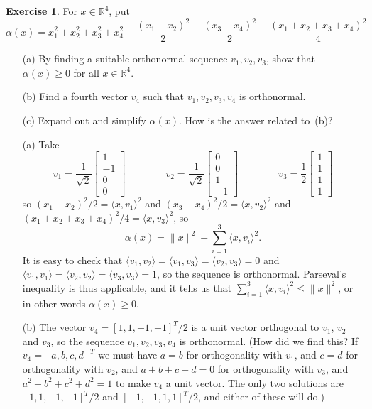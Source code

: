 \documentclass{amsart}
\newcommand{\R}         {{\mathbb{R}}}
\newcommand{\bsm}       {\left[\begin{smallmatrix}}
\newcommand{\esm}       {\end{smallmatrix}\right]}
\newcommand{\al}        {\alpha}
\newcommand{\ip}[1]     {\langle #1\rangle}
\renewcommand{\:}       {\colon}
\theoremstyle{definition}
\newtheorem{exercise}{Exercise}[section]
\renewenvironment{solution}{\SolutionAtEnd}{\endSolutionAtEnd}
\begin{document}
\begin{exercise}
 For $x\in\R^4$, put 
 \[ \al(x) = x_1^2+x_2^2+x_3^2+x_4^2 -
      \frac{(x_1-x_2)^2}{2} -
      \frac{(x_3-x_4)^2}{2} - 
      \frac{(x_1+x_2+x_3+x_4)^2}{4}
 \] 
 \begin{itemize}
  \item[(a)] By finding a suitable orthonormal sequence $v_1,v_2,v_3$,
   show that $\al(x)\geq 0$ for all $x\in\R^4$.
  \item[(b)] Find a fourth vector $v_4$ such that $v_1,v_2,v_3,v_4$ is
   orthonormal.
  \item[(c)] Expand out and simplify $\al(x)$.  How is the answer related to~(b)? 
 \end{itemize}
\end{exercise}
\begin{solution}
 \begin{itemize}
  \item[(a)] Take
   \[ v_1 = \frac{1}{\sqrt{2}}\bsm 1 \\ -1\\ 0 \\ 0 \esm \hspace{4em} 
      v_2 = \frac{1}{\sqrt{2}}\bsm 0 \\ 0\\ 1 \\ -1 \esm \hspace{4em} 
      v_3 = \frac{1}{2} \bsm 1\\ 1\\ 1\\ 1 \esm
   \] 
   so $(x_1-x_2)^2/2=\ip{x,v_1}^2$ and $(x_3-x_4)^2/2=\ip{x,v_2}^2$
   and $(x_1+x_2+x_3+x_4)^2/4=\ip{x,v_3}^2$, so 
   \[ \al(x) = \|x\|^2 - \sum_{i=1}^3 \ip{x,v_i}^2. \]
   It is easy to check that $\ip{v_1,v_2}=\ip{v_1,v_3}=\ip{v_2,v_3}=0$
   and $\ip{v_1,v_1}=\ip{v_2,v_2}=\ip{v_3,v_3}=1$, so the sequence is
   orthonormal.  Parseval's inequality is thus applicable, and it
   tells us that $\sum_{i=1}^3\ip{x,v_i}^2\leq\|x\|^2$, or in other
   words $\al(x)\geq 0$.
  \item[(b)] The vector $v_4=[1,1,-1,-1]^T/2$ is a unit vector
   orthogonal to $v_1$, $v_2$ and $v_3$, so the sequence
   $v_1,v_2,v_3,v_4$ is orthonormal.  (How did we find this?  If
   $v_4=[a,b,c,d]^T$ we must have $a=b$ for orthogonality with $v_1$,
   and $c=d$ for orthogonality with $v_2$, and $a+b+c+d=0$ for
   orthogonality with $v_3$, and $a^2+b^2+c^2+d^2=1$ to make $v_4$ a
   unit vector.  The only two solutions are $[1,1,-1,-1]^T/2$ and
   $[-1,-1,1,1]^T/2$, and either of these will do.)

\end{itemize}
\end{solution}
\end{document}
